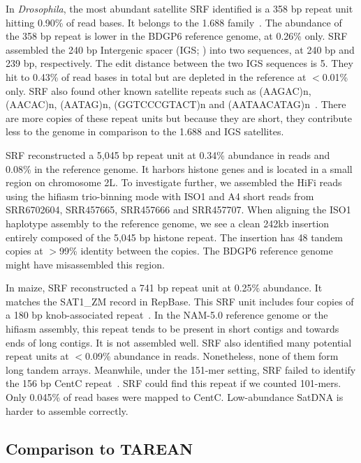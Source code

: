 \documentclass{bioinfo}
\begin{document}
In \emph{Drosophila}, the most abundant satellite SRF identified is a 358 bp
repeat unit hitting 0.90\% of read bases. It belongs to the 1.688
family~\citep{Khost:2017aa}. The abundance of the 358 bp repeat is lower in the
BDGP6 reference genome, at 0.26\% only. SRF assembled the 240 bp Intergenic
spacer (IGS; \citealt{Shatskikh:2020aa}) into two sequences, at 240 bp and
239 bp, respectively. The edit distance between the two IGS sequences is 5. They
hit to 0.43\% of read bases in total but are depleted in the reference at
$<$0.01\% only. SRF also found other known satellite repeats such as (AAGAC)n,
(AACAC)n, (AATAG)n, (GGTCCCGTACT)n and
(AATAACATAG)n~\citep{Shatskikh:2020aa,Thakur:2021aa}.  There are more copies of
these repeat units but because they are short, they contribute less to the
genome in comparison to the 1.688 and IGS satellites.

SRF reconstructed a 5,045 bp repeat unit at 0.34\% abundance in reads and
0.08\% in the reference genome. It harbors histone genes and is located in a
small region on chromosome 2L. To investigate further, we assembled the HiFi
reads using the hifiasm trio-binning mode with ISO1 and A4 short reads from
SRR6702604, SRR457665, SRR457666 and SRR457707. When aligning the ISO1
haplotype assembly to the reference genome, we see a clean 242kb insertion
entirely composed of the 5,045 bp histone repeat. The insertion has 48
tandem copies at $>$99\% identity between the copies. The BDGP6 reference genome might
have misassembled this region.

In maize, SRF reconstructed a 741 bp repeat unit at 0.25\% abundance. It matches
the SAT1\_ZM record in RepBase. This SRF unit includes four copies of a 180 bp
knob-associated repeat~\citep{Ananiev:1998ab}. In the NAM-5.0 reference genome
or the hifiasm assembly, this repeat tends to be present in short contigs and
towards ends of long contigs. It is not assembled well. SRF also identified
many potential repeat units at $<$0.09\% abundance in reads. Nonetheless, none
of them form long tandem arrays. Meanwhile, under the 151-mer setting, SRF failed to identify the 156 bp CentC
repeat~\citep{Ananiev:1998aa}. SRF could find this repeat if we counted
101-mers. Only 0.045\% of read bases were mapped to CentC. Low-abundance SatDNA
is harder to assemble correctly.

\subsection{Comparison to TAREAN}
\end{document}
